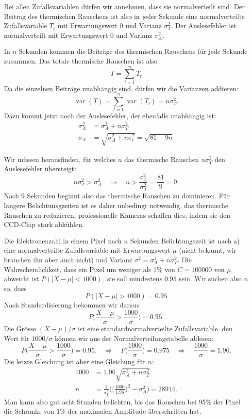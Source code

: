 \begin{loesung}
Bei allen Zufallsvariablen dürfen wir annehmen, dass sie normalverteilt
sind. Der Beitrag des thermischen Rauschens ist also in jeder Sekunde
eine normalverteilte Zufallsvariable $T_t$ mit Erwartungswert 0
und Varianz $\sigma_T^2$.
Der Auslesefehler ist normalverteilt mit Erwartungswert 0 und
Varianz $\sigma_A^2$.
\begin{teilaufgaben}
\item In $n$ Sekunden kommen die Beiträge des thermischen Rauschens
für jede Sekunde zusammen. Das totale thermische Rauschen ist
also
\[
T=\sum_{t=1}^n T_t
\]
Da die einzelnen Beiträge unabhängig sind, dürfen wir die Varianzen
addieren:
\[
\operatorname{var}(T)
=\sum_{t=1}^n\operatorname{var}(T_t)=n\sigma_T^2.
\]
Dazu kommt jetzt noch der Auslesefehler, der ebenfalls unabhängig ist:
\begin{align*}
\sigma_X^2&=\sigma_A^2+n\sigma_T^2\\
\sigma_X&=\sqrt{\sigma_A^2+n\sigma_t^2}=\sqrt{81+9n}
\end{align*}
\item Wir müssen herausfinden, für welches $n$ das thermische
Rauschen $n\sigma_T^2$ den Auslesefehler übersteigt:
\[
n\sigma_T^2>\sigma_A^2\quad\Rightarrow\quad n>\frac{\sigma_A^2}{\sigma_T^2}=\frac{81}{9}=9.
\]
Nach $9$ Sekunden beginnt also das thermische Rauschen zu dominieren.
Für längere Belichtunsgzeiten ist es daher unbedingt notwendig,
das thermische Rauschen zu reduzieren, professionelle Kameras
schaffen dies, indem sie den CCD-Chip stark abkühlen.
\item
Die Elektronenzahl in einem Pixel nach $n$ Sekunden Belichtungszeit ist
nach a) eine normalverteilte Zufallsvariable mit Erwartungswert
$\mu$ (nicht bekannt, wir brauchen ihn aber auch nicht) und Varianz
$\sigma^2=\sigma_A^1+n\sigma_T^2$. Die Wahrscheinlichkeit, dass ein Pixel
um weniger als 1\% von $C=100000$ von $\mu$ abweicht ist
$
P(|X-\mu| < 1000),
$
sie soll mindestens $0.95$ sein. Wir suchen also $n$ so, dass
\[
P(|X-\mu| > 1000) = 0.95
\]
Nach Standardisierung bekommen wir daraus
\[
P\biggl(\frac{X-\mu}{\sigma}> \frac{1000}{\sigma}\biggr)=0.95.
\]
Die Grösse $(X-\mu)/\sigma$ ist eine standardnormalverteilte
Zufallsvariable. den Wert für $1000/\sigma$ können wir aus
der Normalverteilungstabelle ablesen:
\[
P\biggl(\frac{X-\mu}{\sigma}> \frac{1000}{\sigma}\biggr)=0.95.
\quad
\Rightarrow
\quad
F\biggl(\frac{1000}{\sigma}\biggr)=0.975
\quad
\Rightarrow
\quad
\frac{1000}{\sigma}=1.96.
\]
Die letzte Gleichung ist aber eine Gleichung für $n$:
\begin{align*}
1000&=1.96\sqrt{\sigma_A^2 + n\sigma_T^2}\\
n&=\frac1{\sigma_T^2}\biggl(\biggl(\frac{1000}{1.96}\biggr)^2-\sigma_A^2\biggr)
=28914.
\end{align*}
Man kann also gut acht Stunden belichten, bis das Rauschen bei 95\% der
Pixel die Schranke von 1\% der maximalen Amplitude überschritten hat.
\qedhere
\end{teilaufgaben}
\end{loesung}

